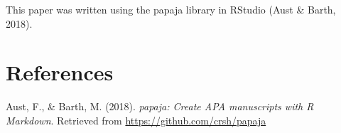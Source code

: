 \documentclass[floatsintext,man]{apa6}
\theoremstyle{definition}
\theoremstyle{definition}
\theoremstyle{definition}
\theoremstyle{remark}
\begin{document}
This paper was written using the papaja library in RStudio (Aust \&
Barth, 2018).

\newpage

\section{References}\label{refs}

\begingroup
\setlength{\parindent}{-0.5in} \setlength{\leftskip}{0.5in}

\hypertarget{refs}{}
\hypertarget{ref-R-papaja}{}
Aust, F., \& Barth, M. (2018). \emph{papaja: Create APA manuscripts with
R Markdown}. Retrieved from \url{https://github.com/crsh/papaja}

\endgroup
\end{document}
